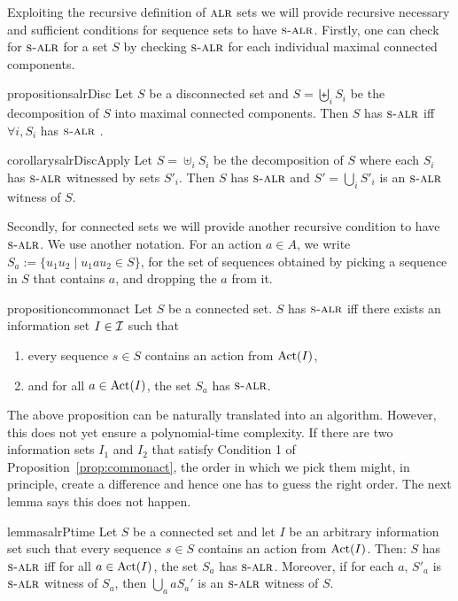 Exploiting the recursive definition of $\textsc{alr}$ sets we will provide
recursive necessary and sufficient conditions for sequence sets to
have $\textsc{s-alr}$.  Firstly, one can check for $\textsc{s-alr}$ for a set $S$ by
checking $\textsc{s-alr}$ for each individual maximal connected components.

\begin{restatable}{proposition}{salrDisc}\label{lem:aloss-shuffle-disconnected}
  Let $S$ be a disconnected set and $S = \biguplus_i S_i$ be the
  decomposition of $S$ into maximal connected components. Then $S$ has
  $\textsc{s-alr}$ iff $\forall i,S_i$ has $\textsc{s-alr}$ .
\end{restatable}

\begin{restatable}{corollary}{salrDiscApply}\label{cor:alosshuffle-disconnected-apply}
  Let $S =\uplus_i S_i$ be the decomposition of $S$ where each $S_i$
  has $\textsc{s-alr}$ witnessed by sets $S'_i$. Then $S$ has $\textsc{s-alr}$ and
  $S' = \bigcup_i S'_i$ is an $\textsc{s-alr}$ witness of $S$.
\end{restatable}

Secondly, for connected sets we will provide another recursive
condition to have $\textsc{s-alr}$. We use another notation. For an action
$a \in A$, we write $S_a := \{u_1 u_2 \mid u_1 a u_2 \in S\}$, for the
set of sequences obtained by picking a sequence in $S$ that contains $a$,
and dropping the $a$ from it.

\begin{restatable}{proposition}{commonact}\label{prop:commonact}
  Let $S$ be a connected set. $S$ has $\textsc{s-alr}$ iff there exists an
  information set $I \in \mathcal{I}$ such that
  \begin{enumerate}   \item every sequence $s \in S$ contains an action from $\operatorname{Act}(I)$,
  \item and for all $a \in \operatorname{Act}(I)$, the set $S_a$ has $\textsc{s-alr}$.
  \end{enumerate}
\end{restatable}

The above proposition can be naturally translated into an
algorithm. However, this does not yet ensure a polynomial-time
complexity. If there are two information sets $I_1$ and $I_2$ that
satisfy Condition 1 of Proposition~\ref{prop:commonact}, the order in
which we pick them might, in principle, create a difference and hence
one has to guess the right order. The next lemma says this does not
happen.

\begin{restatable}{lemma}{salrPtime}\label{lem:salr-common-act}
  Let $S$ be a connected set and let $I$ be an arbitrary information
  set such that every sequence $s \in S$ contains an action from
  $\operatorname{Act}(I)$. Then: $S$ has $\textsc{s-alr}$ iff for all $a \in \operatorname{Act}(I)$, the
  set $S_a$ has $\textsc{s-alr}$. Moreover, if for each $a$, $S'_a$ is $\textsc{s-alr}$ witness of $S_a$, then $\bigcup_{a} aS_a'$ is an $\textsc{s-alr}$ witness of $S$.  
\end{restatable}

